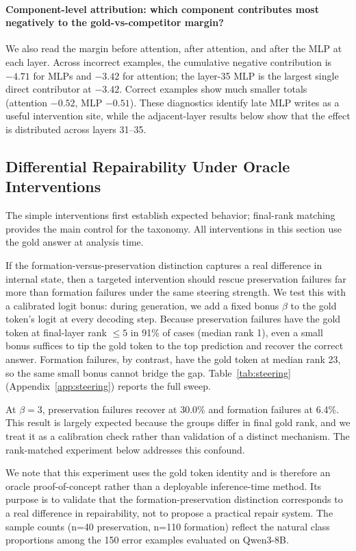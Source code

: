 \documentclass{article} %
\begin{document}
\paragraph{Component-level attribution: which component contributes most negatively to the gold-vs-competitor margin?}
\label{sec:components}
We also read the margin before attention, after attention, and after the MLP at each layer. Across incorrect examples, the cumulative negative contribution is $-4.71$ for MLPs and $-3.42$ for attention; the layer-35 MLP is the largest single direct contributor at $-3.42$. Correct examples show much smaller totals (attention $-0.52$, MLP $-0.51$). These diagnostics identify late MLP writes as a useful intervention site, while the adjacent-layer results below show that the effect is distributed across layers 31--35.

\subsection{Differential Repairability Under Oracle Interventions}

The simple interventions first establish expected behavior; final-rank matching provides the main control for the taxonomy. All interventions in this section use the gold answer at analysis time.

If the formation-versus-preservation distinction captures a real difference in internal state, then a targeted intervention should rescue preservation failures far more than formation failures under the same steering strength. We test this with a calibrated logit bonus: during generation, we add a fixed bonus $\beta$ to the gold token's logit at every decoding step. Because preservation failures have the gold token at final-layer rank $\le5$ in 91\% of cases (median rank 1), even a small bonus suffices to tip the gold token to the top prediction and recover the correct answer. Formation failures, by contrast, have the gold token at median rank 23, so the same small bonus cannot bridge the gap. Table~\ref{tab:steering} (Appendix~\ref{app:steering}) reports the full sweep.

At $\beta=3$, preservation failures recover at 30.0\% and formation failures at 6.4\%. This result is largely expected because the groups differ in final gold rank, and we treat it as a calibration check rather than validation of a distinct mechanism. The rank-matched experiment below addresses this confound.

We note that this experiment uses the gold token identity and is therefore an oracle proof-of-concept rather than a deployable inference-time method. Its purpose is to validate that the formation-preservation distinction corresponds to a real difference in repairability, not to propose a practical repair system. The sample counts (n=40 preservation, n=110 formation) reflect the natural class proportions among the 150 error examples evaluated on Qwen3-8B.
\end{document}
